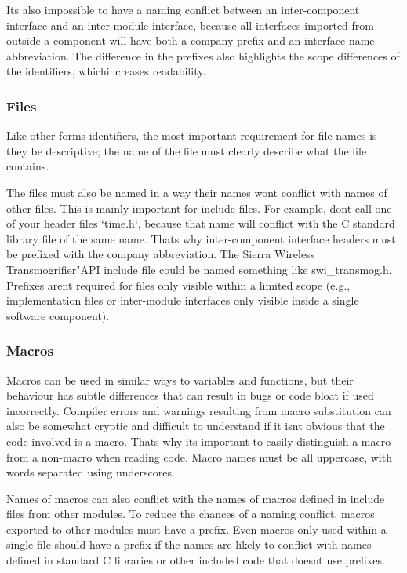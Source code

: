It\textquotesingle{}s also impossible to have a naming conflict between an inter-\/component interface and an inter-\/module interface, because all interfaces imported from outside a component will have both a company prefix and an interface name abbreviation. The difference in the prefixes also highlights the scope differences of the identifiers, whichincreases readability.\hypertarget{ccoding_stds_naming_cstdsFiles}{}\subsubsection{Files}\label{ccoding_stds_naming_cstdsFiles}
Like other forms identifiers, the most important requirement for file names is they be descriptive; the name of the file must clearly describe what the file contains.

The files must also be named in a way their names won\textquotesingle{}t conflict with names of other files. This is mainly important for include files. For example, don\textquotesingle{}t call one of your header files \char`\"{}time.\+h\char`\"{}, because that name will conflict with the C standard library file of the same name. That\textquotesingle{}s why inter-\/component interface headers must be prefixed with the company abbreviation. The Sierra Wireless Transmogrifier"A\+P\+I include file could be named something like {\ttfamily swi\+\_\+transmog.\+h}. Prefixes aren\textquotesingle{}t required for files only visible within a limited scope (e.\+g., implementation files or inter-\/module interfaces only visible inside a single software component).\hypertarget{ccoding_stds_naming_cstdsMacros}{}\subsubsection{Macros}\label{ccoding_stds_naming_cstdsMacros}
Macros can be used in similar ways to variables and functions, but their behaviour has subtle differences that can result in bugs or code bloat if used incorrectly. Compiler errors and warnings resulting from macro substitution can also be somewhat cryptic and difficult to understand if it isn\textquotesingle{}t obvious that the code involved is a macro. That\textquotesingle{}s why it\textquotesingle{}s important to easily distinguish a macro from a non-\/macro when reading code. Macro names must be all uppercase, with words separated using underscores.

Names of macros can also conflict with the names of macros defined in include files from other modules. To reduce the chances of a naming conflict, macros exported to other modules must have a prefix. Even macros only used within a single file should have a prefix if the names are likely to conflict with names defined in standard C libraries or other included code that doesn\textquotesingle{}t use prefixes.





